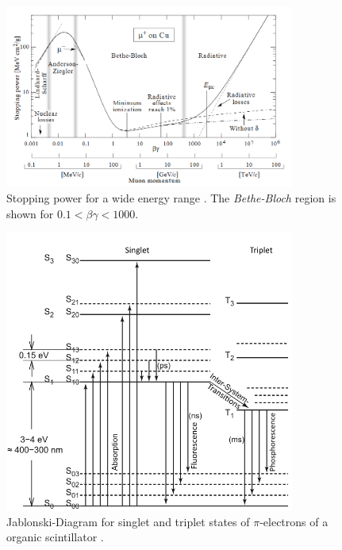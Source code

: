 \begin{figure}[t]
	\centering
	\includegraphics[width=0.85\textwidth]{./graphics/ch1/bethe_bloch_detailed.png}
	\caption[Stopping power for a wide energy range]{Stopping power for a wide energy range \cite{PDG}. The \textit{Bethe-Bloch} region is shown for $0.1<\beta\gamma<1000$.}    
	\label{ap:A:bethe_bloch_detailed}
\end{figure}

\newpage

\begin{figure}[t]
	\centering
	\includegraphics[width=0.85\textwidth]{./graphics/ch2/jablonski.png}
	\caption[Jablonski-Diagram]{Jablonski-Diagram for singlet and triplet states of $\pi$-electrons of a organic scintillator \cite{wermes}.}    
	\label{ap:A:jablonski}
\end{figure}

